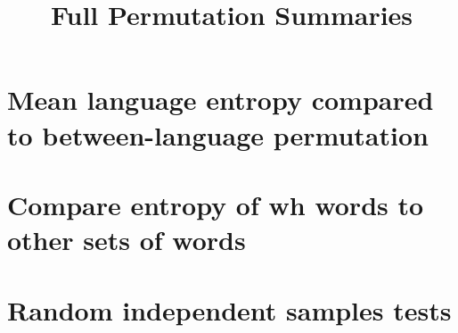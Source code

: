 \documentclass[10pt,a4paper,landscape]{article}
\title{Full Permutation Summaries}
\author{}
\date{} %
\begin{document}
\maketitle

\section{Mean language entropy compared to between-language permutation}


\clearpage
\newpage
\section{Compare entropy of wh words to other sets of words}



\clearpage
\newpage

\section{Random independent samples tests}








\end{document}
